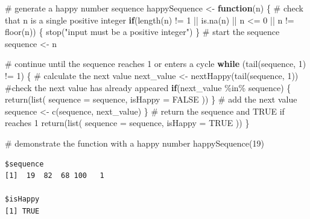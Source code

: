 \documentclass[
  letterpaper,
  DIV=11,
  numbers=noendperiod]{scrartcl}
\newenvironment{Shaded}{\begin{snugshade}}{\end{snugshade}}
\newcommand{\AttributeTok}[1]{\textcolor[rgb]{0.40,0.45,0.13}{#1}}
\newcommand{\CommentTok}[1]{\textcolor[rgb]{0.37,0.37,0.37}{#1}}
\newcommand{\ConstantTok}[1]{\textcolor[rgb]{0.56,0.35,0.01}{#1}}
\newcommand{\ControlFlowTok}[1]{\textcolor[rgb]{0.00,0.23,0.31}{\textbf{#1}}}
\newcommand{\DecValTok}[1]{\textcolor[rgb]{0.68,0.00,0.00}{#1}}
\newcommand{\FunctionTok}[1]{\textcolor[rgb]{0.28,0.35,0.67}{#1}}
\newcommand{\NormalTok}[1]{\textcolor[rgb]{0.00,0.23,0.31}{#1}}
\newcommand{\OtherTok}[1]{\textcolor[rgb]{0.00,0.23,0.31}{#1}}
\newcommand{\SpecialCharTok}[1]{\textcolor[rgb]{0.37,0.37,0.37}{#1}}
\newcommand{\StringTok}[1]{\textcolor[rgb]{0.13,0.47,0.30}{#1}}
\begin{document}
\begin{Shaded}
\begin{Highlighting}[]
\CommentTok{\# generate a happy number sequence}
\NormalTok{happySequence }\OtherTok{\textless{}{-}} \ControlFlowTok{function}\NormalTok{(n) \{}
  \CommentTok{\# check that n is a single positive integer}
  \ControlFlowTok{if}\NormalTok{(}\FunctionTok{length}\NormalTok{(n) }\SpecialCharTok{!=} \DecValTok{1} \SpecialCharTok{||} \FunctionTok{is.na}\NormalTok{(n) }\SpecialCharTok{||}\NormalTok{ n }\SpecialCharTok{\textless{}=} \DecValTok{0} \SpecialCharTok{||}\NormalTok{ n }\SpecialCharTok{!=} \FunctionTok{floor}\NormalTok{(n)) \{}
    \FunctionTok{stop}\NormalTok{(}\StringTok{"input must be a positive integer"}\NormalTok{)}
\NormalTok{  \}}
  \CommentTok{\# start the sequence}
\NormalTok{  sequence }\OtherTok{\textless{}{-}}\NormalTok{ n}
  
  \CommentTok{\# continue until the sequence reaches 1 or enters a cycle}
  \ControlFlowTok{while}\NormalTok{ (}\FunctionTok{tail}\NormalTok{(sequence, }\DecValTok{1}\NormalTok{) }\SpecialCharTok{!=} \DecValTok{1}\NormalTok{) \{}
    \CommentTok{\# calculate the next value}
\NormalTok{    next\_value }\OtherTok{\textless{}{-}} \FunctionTok{nextHappy}\NormalTok{(}\FunctionTok{tail}\NormalTok{(sequence, }\DecValTok{1}\NormalTok{))}
    \CommentTok{\#check the next value has already appeared}
    \ControlFlowTok{if}\NormalTok{(next\_value }\SpecialCharTok{\%in\%}\NormalTok{ sequence) \{}
      \FunctionTok{return}\NormalTok{(}\FunctionTok{list}\NormalTok{(}
        \AttributeTok{sequence =}\NormalTok{ sequence,}
        \AttributeTok{isHappy =} \ConstantTok{FALSE}
\NormalTok{      ))}
\NormalTok{    \}}
    \CommentTok{\# add the next value}
\NormalTok{    sequence }\OtherTok{\textless{}{-}} \FunctionTok{c}\NormalTok{(sequence, next\_value)}
\NormalTok{  \}}
  \CommentTok{\# return the sequence and TRUE if reaches 1}
  \FunctionTok{return}\NormalTok{(}\FunctionTok{list}\NormalTok{(}
    \AttributeTok{sequence =}\NormalTok{ sequence,}
    \AttributeTok{isHappy =} \ConstantTok{TRUE}
\NormalTok{  ))}
\NormalTok{\}}

\CommentTok{\# demonstrate the function with a happy number}
\FunctionTok{happySequence}\NormalTok{(}\DecValTok{19}\NormalTok{)}
\end{Highlighting}
\end{Shaded}

\begin{verbatim}
$sequence
[1]  19  82  68 100   1

$isHappy
[1] TRUE
\end{verbatim}
\end{document}
